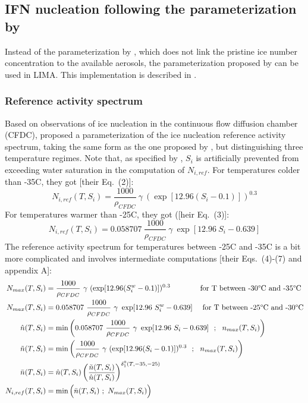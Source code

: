 \subsection{IFN nucleation following the parameterization by \citet{Phillips2008}}

Instead of the parameterization by \citet{Meyers1992}, which does not link the pristine ice number concentration to the available aerosols, the parameterization proposed by \citet{Phillips2008,Phillips2013} can be used in LIMA. This implementation is described in \citet{Berthet2010these,Vie2016}.

\subsubsection{Reference activity spectrum}

Based on observations of ice nucleation in the continuous flow diffusion chamber (CFDC), \citet{Phillips2008} proposed a parameterization of the ice nucleation reference activity spectrum, taking the same form as the one proposed by \citet{Meyers1992}, but distinguishing three temperature regimes. Note that, as specified by \citet{Phillips2008}, $S_i$ is artificially prevented from exceeding water saturation in the computation of $N_{i,ref}$. For temperatures colder than -35\textdegree C, they got [their Eq.\ (2)]:
\begin{equation}
 N_{i,ref} (T,S_i) = \frac{1000}{\rho_{CFDC}} ~ \gamma ~ (\exp[12.96 (S_i-0.1)])^{0.3}
\end{equation}
For temperatures warmer than -25\textdegree C, they got ([heir Eq.\ (3)]:
\begin{equation}
 N_{i,ref} (T,S_i) = 0.058707 ~ \frac{1000}{\rho_{CFDC}} ~ \gamma ~ \exp[12.96 ~ S_i - 0.639]
\end{equation}
The reference activity spectrum for temperatures between -25\textdegree C and -35\textdegree C is a bit more complicated and involves intermediate computations [their Eqs.\ (4)-(7) and appendix A]:
\begin{align}
 N_{max}(T,S_i) &= \frac{1000}{\rho_{CFDC}} ~ \gamma ~ (\exp[12.96 (S_i^w-0.1)])^{0.3} \quad \quad \quad \quad \text{for T between -30\textdegree C and -35\textdegree C} \\
 N_{max}(T,S_i) &= 0.058707 ~ \frac{1000}{\rho_{CFDC}} ~ \gamma ~ \exp[12.96 ~ S_i^w - 0.639] \quad \text{ for T between -25\textdegree C and -30\textdegree C} \\
 \hat{n}(T,S_i) &= \min\bigg( 0.058707 ~ \frac{1000}{\rho_{CFDC}} ~ \gamma ~ \exp[12.96 ~ S_i - 0.639] ~ ~ ; ~ ~ n_{max}(T,S_i) \bigg) \\
 \tilde{n}(T,S_i) &= \min\bigg( \frac{1000}{\rho_{CFDC}} ~ \gamma ~ (\exp[12.96 (S_i-0.1)])^{0.3} ~ ~ ; ~ ~ n_{max}(T,S_i) \bigg) \\
 \bar{n}(T,S_i) &= \hat{n}(T,S_i) \left( \frac{\tilde{n}(T,S_i)}{\hat{n}(T,S_i)} \right)^{\delta_1^0(T,-35,-25)} \\
 N_{i,ref} (T,S_i) &= \min\Big( \bar{n}(T,S_i) ~ ; ~ N_{max}(T,S_i) \Big)
\end{align}

